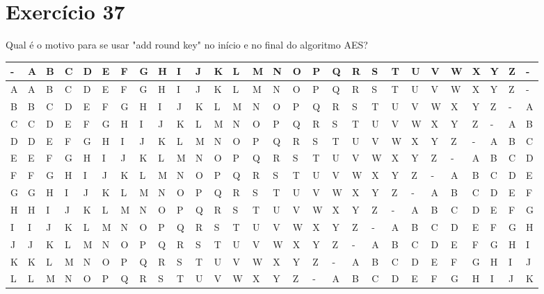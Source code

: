 \documentclass[10pt,a4paper]{article}
\begin{document}
\section*{Exercício 37}
Qual é o motivo para se usar "add round key" no início e no final do algoritmo AES?
\newpage
\begin{landscape}
\begin{table}[!htb]
    \begin{tabular}{|l|l|l|l|l|l|l|l|l|l|l|l|l|l|l|l|l|l|l|l|l|l|l|l|l|l|l|l|}
        \hline
        - & A & B & C & D & E & F & G & H & I & J & K & L & M & N & O & P & Q & R & S & T & U & V & W & X & Y & Z & - \\ \hline
        A & A & B & C & D & E & F & G & H & I & J & K & L & M & N & O & P & Q & R & S & T & U & V & W & X & Y & Z & - \\ 
        B & B & C & D & E & F & G & H & I & J & K & L & M & N & O & P & Q & R & S & T & U & V & W & X & Y & Z & - & A \\ 
        C & C & D & E & F & G & H & I & J & K & L & M & N & O & P & Q & R & S & T & U & V & W & X & Y & Z & - & A & B \\ 
        D & D & E & F & G & H & I & J & K & L & M & N & O & P & Q & R & S & T & U & V & W & X & Y & Z & - & A & B & C \\ 
        E & E & F & G & H & I & J & K & L & M & N & O & P & Q & R & S & T & U & V & W & X & Y & Z & - & A & B & C & D \\ 
        F & F & G & H & I & J & K & L & M & N & O & P & Q & R & S & T & U & V & W & X & Y & Z & - & A & B & C & D & E \\ 
        G & G & H & I & J & K & L & M & N & O & P & Q & R & S & T & U & V & W & X & Y & Z & - & A & B & C & D & E & F \\ 
        H & H & I & J & K & L & M & N & O & P & Q & R & S & T & U & V & W & X & Y & Z & - & A & B & C & D & E & F & G \\ 
        I & I & J & K & L & M & N & O & P & Q & R & S & T & U & V & W & X & Y & Z & - & A & B & C & D & E & F & G & H \\ 
        J & J & K & L & M & N & O & P & Q & R & S & T & U & V & W & X & Y & Z & - & A & B & C & D & E & F & G & H & I \\ 
        K & K & L & M & N & O & P & Q & R & S & T & U & V & W & X & Y & Z & - & A & B & C & D & E & F & G & H & I & J \\ 
        L & L & M & N & O & P & Q & R & S & T & U & V & W & X & Y & Z & - & A & B & C & D & E & F & G & H & I & J & K \\ 

\end{tabular}
\end{table}
\end{landscape}
\end{document}
